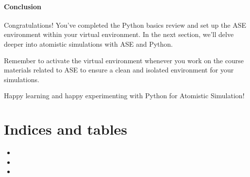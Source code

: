 \documentclass[letterpaper,10pt,english]{sphinxmanual}
\begin{document}
\begin{sphinxVerbatim}[commandchars=\\\{\}]
   

    
  
 
\end{sphinxVerbatim}


\subsubsection{Conclusion}
\label{\detokenize{basics/basics:conclusion}}
\sphinxAtStartPar
Congratulations! You’ve completed the Python basics review and set up the ASE environment within your virtual environment. In the next section, we’ll delve deeper into atomistic simulations with ASE and Python.

\sphinxAtStartPar
Remember to activate the virtual environment whenever you work on the course materials related to ASE to ensure a clean and isolated environment for your simulations.

\sphinxAtStartPar
Happy learning and happy experimenting with Python for Atomistic Simulation!


\chapter{Indices and tables}
\label{\detokenize{index:indices-and-tables}}\begin{itemize}
\item {} 
\sphinxAtStartPar
{}

\item {} 
\sphinxAtStartPar
{}

\item {} 
\sphinxAtStartPar
{}

\end{itemize}



\renewcommand{\indexname}{Index}
\printindex
\end{document}
